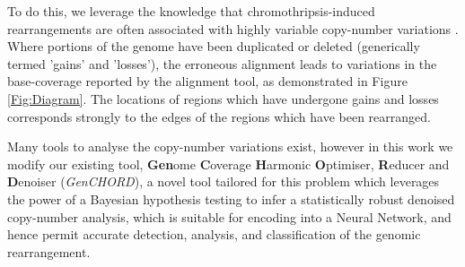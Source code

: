 \documentclass[fleqn,usenatbib]{mnras}
\def\codename{\textit{GenCHORD}}
\begin{document}
		To do this, we leverage the knowledge that chromothripsis-induced rearrangements are often associated with highly variable copy-number variations \citep{Ijaz2024,Chromo2011}. Where portions of the genome have been duplicated or deleted (generically termed 'gains' and 'losses'), the erroneous alignment leads to variations in the base-coverage reported by the alignment tool, as demonstrated in Figure \ref{Fig:Diagram}. {The locations of regions which have undergone gains and losses corresponds strongly to the edges of the regions which have been rearranged.}

		Many tools to analyse the copy-number variations exist, however in this work we modify our existing tool, \textbf{Gen}ome \textbf{C}overage \textbf{H}armonic \textbf{O}ptimiser, \textbf{R}educer and \textbf{D}enoiser (\codename{}), a novel tool tailored for this problem which leverages the power of a Bayesian hypothesis testing to infer a statistically robust denoised copy-number analysis, which is suitable for encoding into a Neural Network, and hence permit accurate detection, analysis, and classification of the genomic rearrangement.
\end{document}

